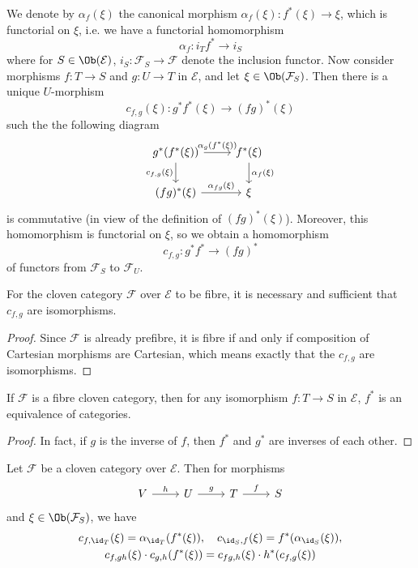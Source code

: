 We denote by $\alpha_f(\xi)$ the canonical morphism $\alpha_f(\xi):f^*(\xi)\to \xi$, which is functorial on $\xi$, i.e. we have a functorial homomorphism
\[\alpha_f:i_Tf^*\to i_S\]
where for $S\in\Ob(\mathcal{E})$, $i_S:\mathcal{F}_S\to \mathscr{F}$ denote the inclusion functor. Now consider morphisms $f:T\to S$ and $g:U\to T$ in $\mathcal{E}$, and let $\xi\in\Ob(\mathcal{F}_S)$. Then there is a unique $U$-morphism
\[c_{f,g}(\xi):g^*f^*(\xi)\to (fg)^*(\xi)\]
such the the following diagram
\[\begin{tikzcd}
g^*(f^*(\xi))\ar[d,swap,"c_{f,g}(\xi)"]\ar[r,"\alpha_g(f^*(\xi))"]&f^*(\xi)\ar[d,"\alpha_f(\xi)"]\\
(fg)^*(\xi)\ar[r,"\alpha_{fg}(\xi)"]&\xi
\end{tikzcd}\]
is commutative (in view of the definition of $(fg)^*(\xi)$). Moreover, this homomorphism is functorial on $\xi$, so we obtain a homomorphism
\[c_{f,g}:g^*f^*\to (fg)^*\]
of functors from $\mathcal{F}_S$ to $\mathcal{F}_U$.
\begin{proposition}\label{fibre cat iff cloven pullback composition isomorphism}
For the cloven category $\mathcal{F}$ over $\mathcal{E}$ to be fibre, it is necessary and sufficient that $c_{f,g}$ are isomorphisms.
\end{proposition}
\begin{proof}
Since $\mathcal{F}$ is already prefibre, it is fibre if and only if composition of Cartesian morphisms are Cartesian, which means exactly that the $c_{f,g}$ are isomorphisms.
\end{proof}
\begin{corollary}\label{fibre cat cloven pullback of isomorphism is equivalence}
If $\mathcal{F}$ is a fibre cloven category, then for any isomorphism $f:T\to S$ in $\mathcal{E}$, $f^*$ is an equivalence of categories.
\end{corollary}
\begin{proof}
In fact, if $g$ is the inverse of $f$, then $f^*$ and $g^*$ are inverses of each other.
\end{proof}
\begin{proposition}\label{fibre cat cloven composition isomorphism with identity formula}
Let $\mathcal{F}$ be a cloven category over $\mathcal{E}$. Then for morphisms
\[\begin{tikzcd}
V\ar[r,"h"]&U\ar[r,"g"]&T\ar[r,"f"]&S
\end{tikzcd}\]
and $\xi\in\Ob(\mathcal{F}_S)$, we have
\begin{gather}
c_{f,\id_T}(\xi)=\alpha_{\id_T}(f^*(\xi)),\quad c_{\id_S,f}(\xi)=f^*(\alpha_{\id_S}(\xi)),\label{fibre cat cloven composition isomorphism with identity formula-1}\\
c_{f,gh}(\xi)\cdot c_{g,h}(f^*(\xi))=c_{fg,h}(\xi)\cdot h^*(c_{f,g}(\xi))\label{fibre cat cloven composition isomorphism with identity formula-2}
\end{gather}
\end{proposition}

